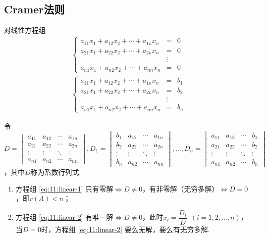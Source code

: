 \subsection{Cramer法则}
\begin{theorem}  \label{th:11:Cramer}
    对线性方程组
    \begin{gather}
        \label{eq:11:linear-1}
        \left\{ \begin{array}{rcl}
            a_{11}x_1+a_{12}x_2+\cdots+a_{1n}x_n&=&0 \\
            a_{21}x_1+a_{22}x_2+\cdots+a_{2n}x_n&=&0 \\
            &\vdots& \\
            a_{n1}x_1+a_{n2}x_2+\cdots+a_{nn}x_n&=&0
        \end{array} \right.
        \\
        \label{eq:11:linear-2}
        \left\{ \begin{array}{rcl}
            a_{11}x_1+a_{12}x_2+\cdots+a_{1n}x_n&=&b_1 \\
            a_{21}x_1+a_{22}x_2+\cdots+a_{2n}x_n&=&b_2 \\
            &\vdots& \\
            a_{n1}x_1+a_{n2}x_2+\cdots+a_{nn}x_n&=&b_n
        \end{array} \right.
    \end{gather}

    令$D=\begin{vmatrix}
        a_{11} & a_{12} & \cdots & a_{1n} \\
        a_{21} & a_{22} & \cdots & a_{2n} \\
        \vdots & \vdots & \ddots & \vdots \\
        a_{n1} & a_{n2} & \cdots & a_{nn}
    \end{vmatrix},D_1=\begin{vmatrix}
        b_1 & a_{12} & \cdots & a_{1n} \\
        b_2 & a_{22} & \cdots & a_{2n} \\
        \vdots & \vdots & \ddots & \vdots \\
        b_n & a_{n2} & \cdots & a_{nn}
    \end{vmatrix},\ldots,D_n=\begin{vmatrix}
        a_{11} & a_{12} & \cdots & b_1 \\
        a_{21} & a_{22} & \cdots & b_2 \\
        \vdots & \vdots & \ddots & \vdots \\
        a_{n1} & a_{n2} & \cdots & b_n
    \end{vmatrix}$，其中$D$称为系数行列式.
    \begin{enumerate}
        \item 方程组 \ref{eq:11:linear-1} 只有零解$\iff D \neq 0$，有非零解（无穷多解）$\iff D=0$，即$r(A)<n$；

        \item 方程组 \ref{eq:11:linear-2} 有唯一解$\iff D \neq 0$，此时$x_i=\dfrac{D_i}{D}\enspace(i=1,2,\ldots,n)$，
        当$D=0$时，方程组 \ref{eq:11:linear-2} 要么无解，要么有无穷多解.
    \end{enumerate}
\end{theorem}
